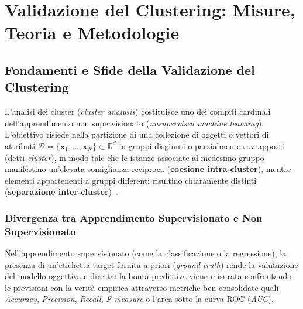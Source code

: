 \chapter{Validazione del Clustering: Misure, Teoria e Metodologie}
\label{chap:dm-cluster-validity}

\FloatBarrier
\section{Fondamenti e Sfide della Validazione del Clustering}
\label{sec:dm-validity-foundations}

L'analisi dei cluster (\textit{cluster analysis}) costituisce uno dei compiti cardinali dell'apprendimento non supervisionato (\textit{unsupervised machine learning}). L'obiettivo risiede nella partizione di una collezione di oggetti o vettori di attributi $\mathcal{D} = \{\mathbf{x}_1, \dots, \mathbf{x}_N\} \subset \mathbb{R}^d$ in gruppi disgiunti o parzialmente sovrapposti (detti \textit{cluster}), in modo tale che le istanze associate al medesimo gruppo manifestino un'elevata somiglianza reciproca (\textbf{coesione intra-cluster}), mentre elementi appartenenti a gruppi differenti risultino chiaramente distinti (\textbf{separazione inter-cluster})~\cite{tan2018}.

\FloatBarrier
\subsection{Divergenza tra Apprendimento Supervisionato e Non Supervisionato}
Nell'apprendimento supervisionato (come la classificazione o la regressione), la presenza di un'etichetta target fornita a priori (\textit{ground truth}) rende la valutazione del modello oggettiva e diretta: la bontà predittiva viene misurata confrontando le previsioni con la verità empirica attraverso metriche ben consolidate quali \textit{Accuracy}, \textit{Precision}, \textit{Recall}, \textit{F-measure} o l'area sotto la curva ROC (\textit{AUC}).


